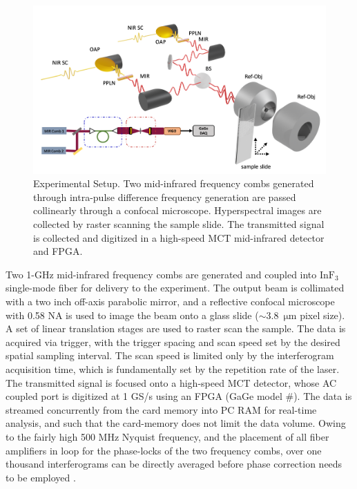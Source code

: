 \documentclass{optica-article}
\begin{document}
\begin{figure}[h]
    \centering
    \includegraphics[width=\linewidth]{setup_3D.png}
    \caption{Experimental Setup. Two mid-infrared frequency combs generated through intra-pulse difference frequency generation are passed collinearly through a confocal microscope. Hyperspectral images are collected by raster scanning the sample slide. The transmitted signal is collected and digitized in a high-speed MCT mid-infrared detector and FPGA.}
    \label{fig:setup}
\end{figure}

Two 1-GHz mid-infrared frequency combs are generated and coupled into $\mathrm{InF_3}$ single-mode fiber for delivery to the experiment. The output beam is collimated with a two inch off-axis parabolic mirror, and a reflective confocal microscope with 0.58 NA is used to image the beam onto a glass slide (\mbox{$\sim$3.8 $\mathrm{\mu m}$} pixel size). A set of linear translation stages are used to raster scan the sample. The data is acquired via trigger, with the trigger spacing and scan speed set by the desired spatial sampling interval. The scan speed is limited only by the interferogram acquisition time, which is fundamentally set by the repetition rate of the laser. The transmitted signal is focused onto a high-speed MCT detector, whose AC coupled port is digitized at 1 GS/s using an FPGA (GaGe model \#). The data is streamed concurrently from the card memory into PC RAM for real-time analysis, and such that the card-memory does not limit the data volume. Owing to the fairly high 500 MHz Nyquist frequency, and the placement of all fiber amplifiers in loop for the phase-locks of the two frequency combs, over one thousand interferograms can be directly averaged before phase correction needs to be employed \cite{hebertSelfcorrectedChipbasedDualcomb2017,hebertSelfCorrectionLimitsDualComb2019}.
\end{document}
